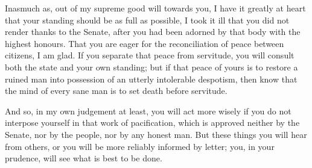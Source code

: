 

 Inasmuch as, out of my supreme good will towards you, I have it greatly at heart that your standing should be as full as possible, I took it ill that you did not render thanks to the Senate, after you had been adorned by that body with the highest honours. That you are eager for the reconciliation of peace between citizens, I am glad. If you separate that peace from servitude, you will consult both the state and your own standing; but if that peace of yours is to restore a ruined man into possession of an utterly intolerable despotism, then know that the mind of every sane man is to set death before servitude.

 And so, in my own judgement at least, you will act more wisely if you do not interpose yourself in that work of pacification, which is approved neither by the Senate, nor by the people, nor by any honest man. But these things you will hear from others, or you will be more reliably informed by letter; you, in your prudence, will see what is best to be done.
